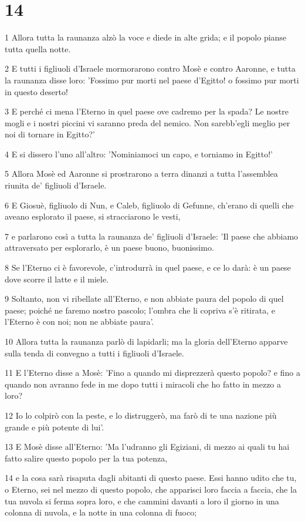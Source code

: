 \chapter{14}

\par 1 Allora tutta la raunanza alzò la voce e diede in alte grida; e il popolo pianse tutta quella notte.
\par 2 E tutti i figliuoli d'Israele mormorarono contro Mosè e contro Aaronne, e tutta la raunanza disse loro: 'Fossimo pur morti nel paese d'Egitto! o fossimo pur morti in questo deserto!
\par 3 E perché ci mena l'Eterno in quel paese ove cadremo per la spada? Le nostre mogli e i nostri piccini vi saranno preda del nemico. Non sarebb'egli meglio per noi di tornare in Egitto?'
\par 4 E si dissero l'uno all'altro: 'Nominiamoci un capo, e torniamo in Egitto!'
\par 5 Allora Mosè ed Aaronne si prostrarono a terra dinanzi a tutta l'assemblea riunita de' figliuoli d'Israele.
\par 6 E Giosuè, figliuolo di Nun, e Caleb, figliuolo di Gefunne, ch'erano di quelli che aveano esplorato il paese, si stracciarono le vesti,
\par 7 e parlarono così a tutta la raunanza de' figliuoli d'Israele: 'Il paese che abbiamo attraversato per esplorarlo, è un paese buono, buonissimo.
\par 8 Se l'Eterno ci è favorevole, c'introdurrà in quel paese, e ce lo darà: è un paese dove scorre il latte e il miele.
\par 9 Soltanto, non vi ribellate all'Eterno, e non abbiate paura del popolo di quel paese; poiché ne faremo nostro pascolo; l'ombra che li copriva s'è ritirata, e l'Eterno è con noi; non ne abbiate paura'.
\par 10 Allora tutta la raunanza parlò di lapidarli; ma la gloria dell'Eterno apparve sulla tenda di convegno a tutti i figliuoli d'Israele.
\par 11 E l'Eterno disse a Mosè: 'Fino a quando mi disprezzerà questo popolo? e fino a quando non avranno fede in me dopo tutti i miracoli che ho fatto in mezzo a loro?
\par 12 Io lo colpirò con la peste, e lo distruggerò, ma farò di te una nazione più grande e più potente di lui'.
\par 13 E Mosè disse all'Eterno: 'Ma l'udranno gli Egiziani, di mezzo ai quali tu hai fatto salire questo popolo per la tua potenza,
\par 14 e la cosa sarà risaputa dagli abitanti di questo paese. Essi hanno udito che tu, o Eterno, sei nel mezzo di questo popolo, che apparisci loro faccia a faccia, che la tua nuvola si ferma sopra loro, e che cammini davanti a loro il giorno in una colonna di nuvola, e la notte in una colonna di fuoco;
